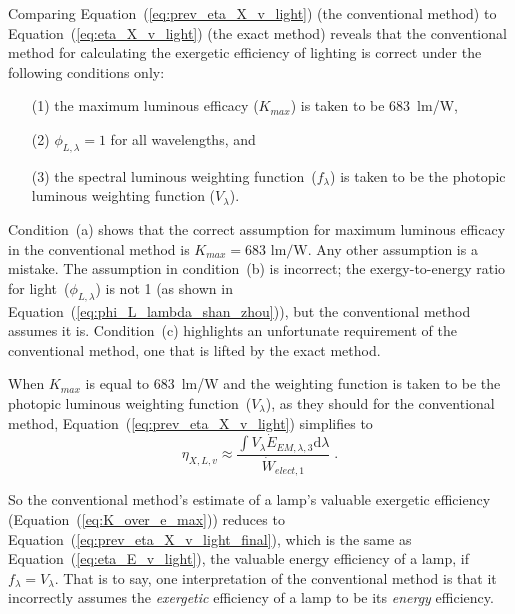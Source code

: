 \documentclass[energies,article,accept,moreauthors,pdftex]{Definitions/mdpi}\usepackage[]{graphicx}\usepackage[]{color}
\begin{document}
Comparing Equation~(\ref{eq:prev_eta_X_v_light}) (the conventional method)
to Equation~(\ref{eq:eta_X_v_light}) (the exact method)
reveals that the conventional method for calculating the exergetic efficiency of lighting
is correct under the following conditions only:
%
\begin{enumerate}[leftmargin=8mm,labelsep=3mm] 

  \item[(1)] the maximum luminous efficacy ($K_{max}$) is taken to be 683~lm/W, 

  \item[(2)] $\phi_{L,\lambda} = 1$ for all wavelengths, and

  \item[(3)] the spectral luminous weighting function~($f_\lambda$) is taken to be
        the photopic luminous weighting function ($V_\lambda$).

\end{enumerate}

Condition~(a) shows that the correct assumption for maximum luminous efficacy 
in the conventional method 
is $K_{max} = 683 \text{ lm/W}$.
Any other assumption is a mistake.
The assumption in condition~(b) is incorrect;
the exergy-to-energy ratio for light~($\phi_{L,\lambda}$) is not 1
(as shown in Equation~(\ref{eq:phi_L_lambda_shan_zhou})), but the conventional method assumes it is.
Condition~(c) highlights an unfortunate requirement of the conventional method, 
one that is lifted by the exact method.

When $K_{max}$ is equal to 683~lm/W and
the weighting function is taken to be the photopic luminous weighting function~($V_\lambda$),
as they should for the conventional method,
Equation~(\ref{eq:prev_eta_X_v_light}) simplifies to 
\begin{equation} \label{eq:prev_eta_X_v_light_final}
  \eta_{X,L,v} \approx \frac{\int V_\lambda \dot{E}_{EM,\lambda,3} \mathrm{d}\lambda}{\dot{W}_{elect,1}}\; .
\end{equation}

So the conventional method's estimate 
of a lamp's valuable exergetic efficiency
(Equation~(\ref{eq:K_over_e_max})) 
reduces to Equation~(\ref{eq:prev_eta_X_v_light_final}), 
which is the same as Equation~(\ref{eq:eta_E_v_light}),
the valuable energy efficiency of a lamp, 
\mbox{if $f_\lambda = V_\lambda$}.
That is to say, one interpretation of the conventional method
is that it incorrectly 
assumes the \emph{exergetic} efficiency of a lamp
to be its \emph{energy} efficiency.
\end{document}
